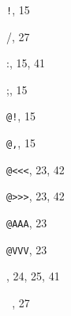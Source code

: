 \begin{theindex}

\small

  \item {\tt\bslash !}, 15
  \item {\ptt \bslash /}, 27
  \item {\ptt \bslash :}, 15, 41
  \item {\ptt \bslash ;}, 15
  \item {\tt{}@!}, 15
  \item {\tt{}@,}, 15
  \item {\tt{}@<<<}, 23, 42
  \item {\tt{}@>>>}, 23, 42
  \item {\tt{}@AAA}, 23
  \item {\tt{}@VVV}, 23
  \item {\ptt \bslash \bslash }, 24, 25, 41
  \item {\tt\string~}, 27

  \indexspace


\end{theindex}
